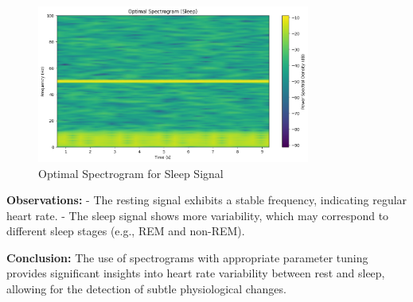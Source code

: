 \documentclass[10pt]{article}
\theoremstyle{definition}
\theoremstyle{remark}
\theoremstyle{definition}
\numberwithin{equation}{prob}
\begin{document}
\begin{figure}[h]
    \centering
    \includegraphics[width=0.8\textwidth]{./figures/Optimal Spectrogram (Sleep).png}
    \caption{Optimal Spectrogram for Sleep Signal}
\end{figure}

\textbf{Observations:}
- The resting signal exhibits a stable frequency, indicating regular heart rate.
- The sleep signal shows more variability, which may correspond to different sleep stages (e.g., REM and non-REM).

\textbf{Conclusion:} The use of spectrograms with appropriate parameter tuning provides significant insights into heart rate variability between rest and sleep, allowing for the detection of subtle physiological changes.
\end{document}
